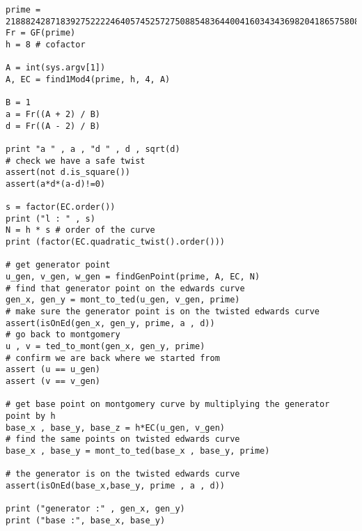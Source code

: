 \begin{lstlisting}
prime = 21888242871839275222246405745257275088548364400416034343698204186575808495617
Fr = GF(prime)
h = 8 # cofactor

A = int(sys.argv[1])
A, EC = find1Mod4(prime, h, 4, A)

B = 1
a = Fr((A + 2) / B)
d = Fr((A - 2) / B)

print "a " , a , "d " , d , sqrt(d)
# check we have a safe twist
assert(not d.is_square())
assert(a*d*(a-d)!=0)

s = factor(EC.order())
print ("l : " , s)
N = h * s # order of the curve
print (factor(EC.quadratic_twist().order()))

# get generator point
u_gen, v_gen, w_gen = findGenPoint(prime, A, EC, N)
# find that generator point on the edwards curve
gen_x, gen_y = mont_to_ted(u_gen, v_gen, prime)
# make sure the generator point is on the twisted edwards curve
assert(isOnEd(gen_x, gen_y, prime, a , d))
# go back to montgomery
u , v = ted_to_mont(gen_x, gen_y, prime)
# confirm we are back where we started from
assert (u == u_gen)
assert (v == v_gen)

# get base point on montgomery curve by multiplying the generator point by h
base_x , base_y, base_z = h*EC(u_gen, v_gen)
# find the same points on twisted edwards curve
base_x , base_y = mont_to_ted(base_x , base_y, prime)

# the generator is on the twisted edwards curve
assert(isOnEd(base_x,base_y, prime , a , d))

print ("generator :" , gen_x, gen_y)
print ("base :", base_x, base_y)
\end{lstlisting}
